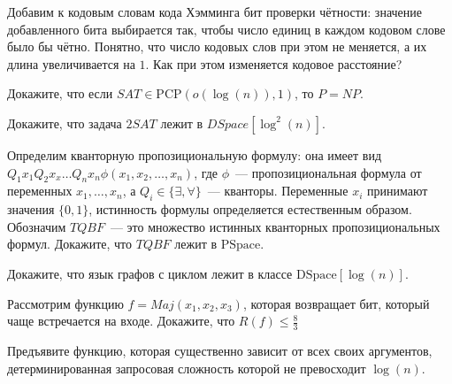 \begin{task}
	Добавим к кодовым словам кода Хэмминга бит проверки чётности: значение
	добавленного бита выбирается так, чтобы число единиц в каждом кодовом слове было
    бы чётно. Понятно, что число кодовых слов при этом не меняется, а их длина
    увеличивается на $1$. Как при этом изменяется кодовое расстояние?
\end{task}


\breakline

\begin{ptask}{39}
    Докажите, что если $SAT \in \mathrm{PCP}(o(\log(n)), 1)$, то $P = NP$.
\end{ptask}

\begin{ptask}{41}
	Докажите, что задача $2SAT$ лежит в $DSpace[\log^2(n)]$.    
\end{ptask}

\begin{ptask}{42}
	Определим кванторную пропозициональную формулу: она имеет вид \\
    $Q_1 x_1 Q_2 x_x \dots Q_n x_n \phi(x_1, x_2, \dots, x_n)$, где $\phi$~---
    пропозициональная формула от переменных $x_1, \dots, x_n$, а $Q_i \in \{\exists,
    \forall\}$~--- кванторы. Переменные $x_i$ принимают значения $\{0, 1\}$,
    истинность формулы определяется естественным образом. Обозначим $TQBF$~--- это
    множество истинных кванторных пропозициональных формул. Докажите, что $TQBF$
    лежит в $\mathrm{PSpace}$.
\end{ptask}

\begin{ptask}{43}
    Докажите, что язык графов с циклом лежит в классе $\mathrm{DSpace}[\log(n)]$.
\end{ptask}

\begin{ptask}{45}
    Рассмотрим функцию $f = Maj(x_1, x_2, x_3)$, которая возвращает бит, который чаще
    встречается на входе. Докажите, что $R(f) \le \frac{8}{3}$
\end{ptask}

\begin{ptask}{47}
    Предъявите функцию, которая существенно зависит от всех своих аргументов,
    детерминированная запросовая сложность которой не превосходит $\log(n)$.
\end{ptask}
